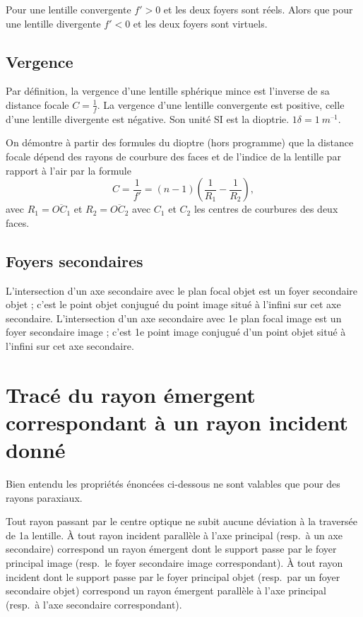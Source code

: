 Pour une lentille convergente \(f' > 0\) et les deux foyers sont réels. Alors 
que pour une lentille divergente \(f' < 0\) et les deux foyers sont virtuels.

\subsection{Vergence}%
\label{chap8-subsec:vergence}%

Par définition, la vergence d'une lentille sphérique mince est l'inverse de sa 
distance focale \(C =\frac{1}{f}\). La vergence d'une lentille convergente est 
positive, celle d'une lentille divergente est négative. Son unité SI est la 
dioptrie. \(1 \delta = \SI{1}{m^{–1}}\).

On démontre à partir des formules du dioptre (hors programme) que la distance 
focale dépend des rayons de courbure des faces et de l'indice de la lentille 
par rapport à l'air par la formule
\begin{equation}%
  C = \frac{1}{f'} = (n-1) \left(\frac{1}{R_1} - \frac{1}{R_2}\right),
\end{equation}%
avec \(R_1 = \overline{OC_1}\) et \(R_2 = \overline{OC_2}\) avec \(C_1\) et 
\(C_2\) les centres de courbures des deux faces.

\subsection{Foyers secondaires}%
\label{chap8-subsec:foyerssecondaires}%

L'intersection d'un axe secondaire avec le plan focal objet est un foyer 
secondaire objet ; c'est le point objet conjugué du point image situé à 
l'infini sur cet axe secondaire. L'intersection d'un axe secondaire avec 1e 
plan focal image est un foyer secondaire image ; c'est 1e point image conjugué 
d'un point objet situé à l'infini sur cet axe secondaire.

\section{Tracé du rayon émergent correspondant à un rayon incident donné}%
\label{chap8-sec:trace}%

Bien entendu les propriétés énoncées ci-dessous ne sont valables que pour des 
rayons paraxiaux.

Tout rayon passant par le centre optique ne subit aucune déviation à la 
traversée de 1a lentille. À tout rayon incident parallèle à l'axe principal 
(resp.\ à un axe secondaire) correspond un rayon émergent dont le support passe 
par le foyer principal image (resp.\ le foyer secondaire image correspondant).
À tout rayon incident dont le support passe par le foyer principal objet 
(resp.\ par un foyer secondaire objet) correspond un rayon émergent parallèle
à l'axe principal (resp.\ à l'axe secondaire correspondant).

